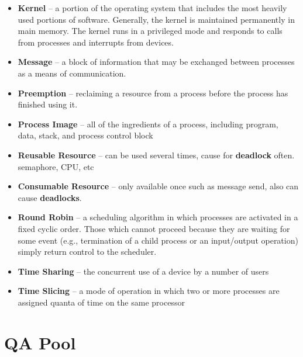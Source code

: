 \documentclass[fontsize=5pt]{scrartcl}
\begin{document}
\begin{multicols}{3}
\begin{itemize}
      \item \textbf{Kernel} – a portion of the operating system that includes the most heavily used portions of software.  Generally, the kernel is maintained permanently in main memory.  
              The kernel runs in a privileged mode and responds to calls from processes and interrupts from devices.
      \item \textbf{Message} – a block of information that may be exchanged between processes as a means of communication.
      \item \textbf{Preemption} – reclaiming a resource from a process before the process has finished using it.
      \item \textbf{Process Image} – all of the ingredients of a process, including program, data, stack, and process control block
      \item \textbf{Reusable Resource} – can be used several times, cause for \textbf{deadlock} often. semaphore, CPU, etc
      \item \textbf{Consumable Resource} – only available once such as message send, also can cause \textbf{deadlocks}.
      \item \textbf{Round Robin} – a scheduling algorithm in which processes are activated in a fixed cyclic order.  Those which cannot proceed because they are waiting for some event 
                    (e.g., termination of a child process or an input/output operation) simply return control to the scheduler.
      \item \textbf{Time Sharing} – the concurrent use of a device by a number of users
      \item \textbf{Time Slicing} – a mode of operation in which two or more processes are assigned quanta of time on the same processor
    \end{itemize}
  \section{QA Pool}

\end{multicols}
\end{document}
